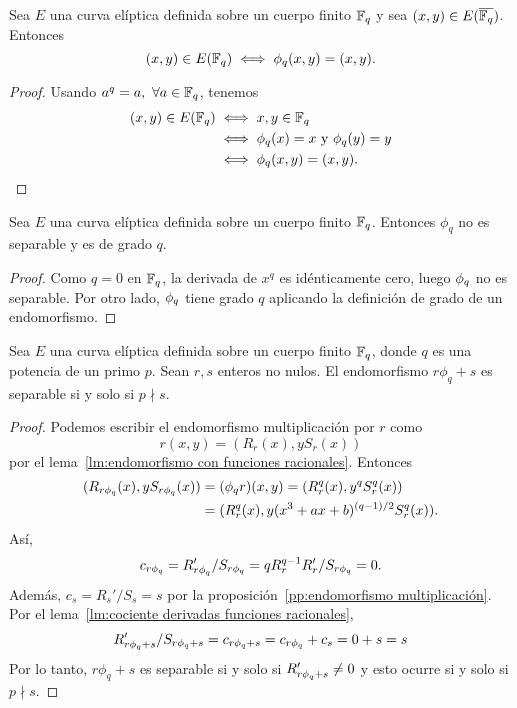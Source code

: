 \begin{lema}\label{lm:elementos fijos endomorfismo Frobenius}
	Sea $E$ una curva elíptica definida sobre un cuerpo finito $\mathbb{F}_q$ y sea $(x, y) \in E(\overline{\mathbb{F}_q})$. Entonces
	$$
		(x, y) \in E(\mathbb{F}_q) \iff \phi_q(x, y) = (x, y).
	$$
\end{lema}
\begin{proof}
Usando $a^q = a, \ \forall a \in \mathbb{F}_q$, tenemos
	\begin{align*}
		(x, y) \in E(\mathbb{F}_q) &\iff x, y \in \mathbb{F}_q \\
			&\iff \phi_q(x) = x \textrm{ y } \phi_q(y) = y \\
			&\iff \phi_q(x, y) = (x, y).
	\end{align*}
\end{proof}

\begin{lema}
	Sea $E$ una curva elíptica definida sobre un cuerpo finito $\mathbb{F}_q$. Entonces $\phi_q$ no es separable y es de grado $q$.
\end{lema}
\begin{proof}

Como $q = 0$ en $\mathbb{F}_q$, la derivada de $x^q$ es idénticamente cero, luego $\phi_q$ no es separable. Por otro lado, $\phi_q$ tiene grado $q$ aplicando la definición de grado de un endomorfismo.
\end{proof}

\begin{proposicion}\label{pp:separabilidad endomorfismo frobenius menos uno}
	Sea $E$ una curva elíptica definida sobre un cuerpo finito $\mathbb{F}_q$, donde $q$ es una potencia de un primo $p$. Sean $r, s$ enteros no nulos. El endomorfismo $r \phi_q + s$ es separable si y solo si $p \nmid s$.
\end{proposicion}
\begin{proof}
Podemos escribir el endomorfismo multiplicación por $r$ como
$$
	r(x, y) = (R_r(x), y S_r(x))
$$
por el lema~\ref{lm:endomorfismo con funciones racionales}. Entonces
\begin{align*}
	(R_{r \phi_q}(x), y S_{r \phi_q}(x)) &= (\phi_q r) ( x, y) = (R_r^q(x), y^q S_r^q(x)) \\
	&= (R_r^q(x), y(x^3 + a x + b)^{(q-1)/2} S_r^q(x)).
\end{align*}
Así,
$$
	c_{r \phi_q} = R_{r \phi_q}' / S_{r \phi_q} = q R_r^{q - 1} R_r' / S_{r \phi_q} = 0.
$$
Además, $c_s = R_s' / S_s = s$ por la proposición~\ref{pp:endomorfismo multiplicación}. Por el lema~\ref{lm:cociente derivadas funciones racionales},
$$
	R_{r \phi_q + s}' / S_{r \phi_q + s} = c_{r \phi_q + s} = c_{r \phi_q} + c_{s} = 0 + s = s
$$
Por lo tanto, $r \phi_q + s$ es separable si y solo si $R_{r \phi_q + s}' \neq 0$ y esto ocurre si y solo si $p \nmid s$.
\end{proof}

